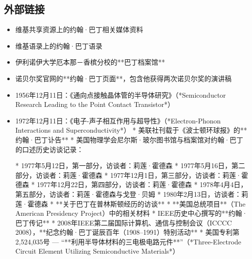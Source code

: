 \subsection{外部链接}
\begin{itemize}
\item 维基共享资源上的约翰·巴丁相关媒体资料
\item 维基语录上的约翰·巴丁语录
\item 伊利诺伊大学厄本那－香槟分校的**巴丁档案馆**
\item 诺贝尔奖官网的**约翰·巴丁页面**，包含他获得两次诺贝尔奖的演讲稿

  \item 1956年12月11日：《通向点接触晶体管的半导体研究》（*Semiconductor Research Leading to the Point Contact Transistor*）
 \item 1972年12月11日：《电子-声子相互作用与超导性》（*Electron-Phonon Interactions and Superconductivity*）
* 美联社刊载于《波士顿环球报》的**约翰·巴丁讣告**
* 美国物理学会尼尔斯·玻尔图书馆与档案馆对约翰·巴丁的口述历史访谈记录：

  * 1977年5月12日，第一部分，访谈者：莉莲·霍德森
  * 1977年5月16日，第二部分，访谈者：莉莲·霍德森
  * 1977年12月1日，第三部分，访谈者：莉莲·霍德森
  * 1977年12月22日，第四部分，访谈者：莉莲·霍德森
  * 1978年4月4日，第五部分，访谈者：莉莲·霍德森与戈登·贝姆
  * 1980年2月13日，访谈者：莉莲·霍德森
* **关于巴丁在普林斯顿经历的访谈**
* **美国总统项目**（The American Presidency Project）中的相关材料
* IEEE历史中心撰写的**约翰·巴丁传记**
* 2008年IEEE第二届国际计算机、通信与控制会议（ICCCC 2008），**纪念约翰·巴丁诞辰百年（1908–1991）特别活动**
* 美国专利第2,524,035号 — “**利用半导体材料的三电极电路元件**”（*Three-Electrode Circuit Element Utilizing Semiconductive Materials*）
\end{itemize}
